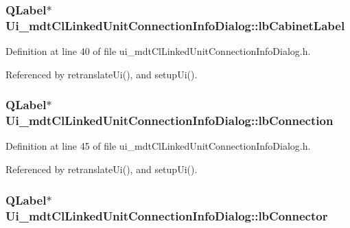 \hypertarget{class_ui__mdt_cl_linked_unit_connection_info_dialog_a710c7b2070ce9cce2fcd99428674d012}{
\subsubsection[{lb\-Cabinet\-Label}]{\setlength{\rightskip}{0pt plus 5cm}Q\-Label$\ast$ Ui\-\_\-mdt\-Cl\-Linked\-Unit\-Connection\-Info\-Dialog\-::lb\-Cabinet\-Label}}\label{class_ui__mdt_cl_linked_unit_connection_info_dialog_a710c7b2070ce9cce2fcd99428674d012}


Definition at line 40 of file ui\-\_\-mdt\-Cl\-Linked\-Unit\-Connection\-Info\-Dialog.\-h.



Referenced by retranslate\-Ui(), and setup\-Ui().

\hypertarget{class_ui__mdt_cl_linked_unit_connection_info_dialog_a5c7208916d5f34f4dd57c28635407700}{
\subsubsection[{lb\-Connection}]{\setlength{\rightskip}{0pt plus 5cm}Q\-Label$\ast$ Ui\-\_\-mdt\-Cl\-Linked\-Unit\-Connection\-Info\-Dialog\-::lb\-Connection}}\label{class_ui__mdt_cl_linked_unit_connection_info_dialog_a5c7208916d5f34f4dd57c28635407700}


Definition at line 45 of file ui\-\_\-mdt\-Cl\-Linked\-Unit\-Connection\-Info\-Dialog.\-h.



Referenced by retranslate\-Ui(), and setup\-Ui().

\hypertarget{class_ui__mdt_cl_linked_unit_connection_info_dialog_ac0273b35f8bfb5ebc364b5cd75dbec1e}{
\subsubsection[{lb\-Connector}]{\setlength{\rightskip}{0pt plus 5cm}Q\-Label$\ast$ Ui\-\_\-mdt\-Cl\-Linked\-Unit\-Connection\-Info\-Dialog\-::lb\-Connector}}\label{class_ui__mdt_cl_linked_unit_connection_info_dialog_ac0273b35f8bfb5ebc364b5cd75dbec1e}



